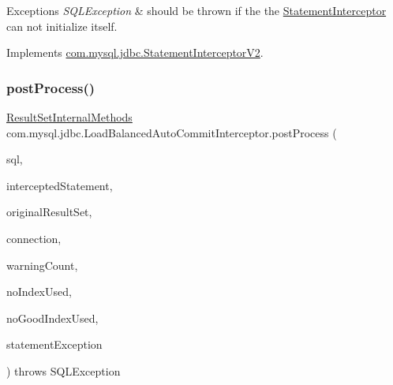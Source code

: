\begin{DoxyExceptions}{Exceptions}
{\em S\+Q\+L\+Exception} & should be thrown if the the \mbox{\hyperlink{interfacecom_1_1mysql_1_1jdbc_1_1_statement_interceptor}{Statement\+Interceptor}} can not initialize itself. \\
\hline
\end{DoxyExceptions}


Implements \mbox{\hyperlink{interfacecom_1_1mysql_1_1jdbc_1_1_statement_interceptor_v2_ae2d3d924826dcf4a4e025433af0b4d8f}{com.\+mysql.\+jdbc.\+Statement\+Interceptor\+V2}}.

\mbox{\label{classcom_1_1mysql_1_1jdbc_1_1_load_balanced_auto_commit_interceptor_a54b925109880e6e84eb16b36f608ecd3}} 
\subsubsection{\texorpdfstring{post\+Process()}{postProcess()}}
{\footnotesize\ttfamily \mbox{\hyperlink{interfacecom_1_1mysql_1_1jdbc_1_1_result_set_internal_methods}{Result\+Set\+Internal\+Methods}} com.\+mysql.\+jdbc.\+Load\+Balanced\+Auto\+Commit\+Interceptor.\+post\+Process (\begin{DoxyParamCaption}\item[{String}]{sql,  }\item[{\mbox{\hyperlink{interfacecom_1_1mysql_1_1jdbc_1_1_statement}{Statement}}}]{intercepted\+Statement,  }\item[{\mbox{\hyperlink{interfacecom_1_1mysql_1_1jdbc_1_1_result_set_internal_methods}{Result\+Set\+Internal\+Methods}}}]{original\+Result\+Set,  }\item[{\mbox{\hyperlink{interfacecom_1_1mysql_1_1jdbc_1_1_connection}{Connection}}}]{connection,  }\item[{int}]{warning\+Count,  }\item[{boolean}]{no\+Index\+Used,  }\item[{boolean}]{no\+Good\+Index\+Used,  }\item[{S\+Q\+L\+Exception}]{statement\+Exception }\end{DoxyParamCaption}) throws S\+Q\+L\+Exception}

